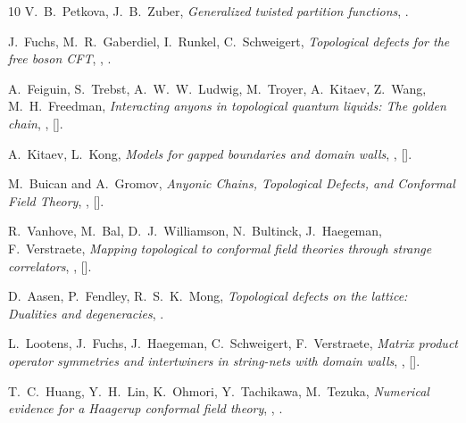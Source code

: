 \documentclass[11pt,a4paper]{article}
\numberwithin{equation}{section}
\begin{document}
\begin{thebibliography}{10}
V.~B.~Petkova, J.~B.~Zuber,
{\it Generalized twisted partition functions},
.

J.~Fuchs, M.~R.~Gaberdiel, I.~Runkel, C.~Schweigert,
{\it Topological defects for the free boson CFT},
,
.

A.~Feiguin, S.~Trebst, A.~W.~W.~Ludwig, M.~Troyer, A.~Kitaev, Z.~Wang, M.~H.~Freedman,
\textit{Interacting anyons in topological quantum liquids: The golden chain},
,
[].

A.~Kitaev, L.~Kong,
\textit{Models for gapped boundaries and domain walls},
,
[].

M.~Buican and A.~Gromov,
\textit{Anyonic Chains, Topological Defects, and Conformal Field Theory},
,
[].

R.~Vanhove, M.~Bal, D.~J.~Williamson, N.~Bultinck, J.~Haegeman, F.~Verstraete,
\textit{Mapping topological to conformal field theories through
  strange correlators},
,
[].

D.~Aasen, P.~Fendley, R.~S.~K.~Mong,
\textit{Topological defects on the lattice: Dualities and degeneracies},
.

L.~Lootens, J.~Fuchs, J.~Haegeman, C.~Schweigert, F.~Verstraete,
\textit{Matrix product operator symmetries and intertwiners in string-nets with domain walls},
,
[].

T.~C.~Huang, Y.~H.~Lin, K.~Ohmori, Y.~Tachikawa, M.~Tezuka,
\textit{Numerical evidence for a Haagerup conformal field theory},
,
.


\end{thebibliography}
\end{document}
